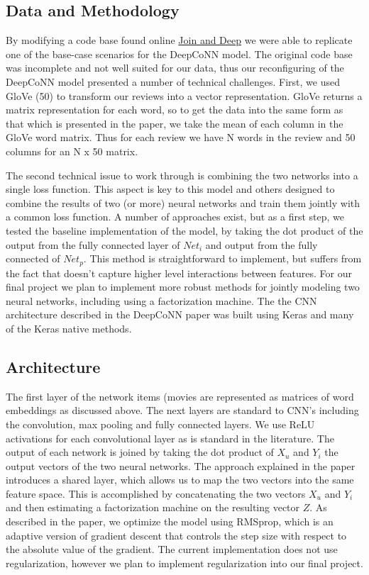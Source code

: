\documentclass[10pt,twocolumn,letterpaper]{article}
\begin{document}
\subsection{Data and Methodology}

By modifying a code base found online \href{https://github.com/Praznat/uifud/tree/291b0882b02bf77edf9b310aeeb345784113b1f5}{Join and Deep} we were able to replicate one of the base-case scenarios for the DeepCoNN model. The original code base was incomplete and not well suited for our data, thus our reconfiguring of the DeepCoNN model presented a number of technical challenges. First, we used GloVe (50) to transform our reviews into a vector representation. GloVe returns a matrix representation for each word, so to get the data into the same form as that which is presented in the paper, we take the mean of each column in the GloVe word matrix. Thus for each review we have N words in the review and 50 columns for an N x 50 matrix.

The second technical issue to work through is combining the two networks into a single loss function. This aspect is key to this model and others designed to combine the results of two (or more) neural networks and train them jointly with a common loss function. A number of approaches exist, but as a first step, we tested the baseline implementation of the model, by taking the dot product of the output from the fully connected layer of $Net_{i}$ and output from the fully connected of $Net_{p}$. This method is straightforward to implement, but suffers from the fact that doesn't capture higher level interactions between features. For our final project we plan to implement more robust methods for jointly modeling two neural networks, including using a factorization machine. The the CNN architecture described in the DeepCoNN paper was built using Keras and many of the Keras native methods. 

\subsection{Architecture}

The first layer of the network items (movies are represented as matrices of word embeddings as discussed above. The next layers are standard to CNN's including the convolution, max pooling and fully connected layers.  We use ReLU activations for each convolutional layer as is standard in the literature. The output of each network is joined by taking the dot product of $X_{u}$ and $Y_{i}$ the output vectors of the two neural networks. The approach explained in the paper introduces a shared layer, which allows us to map the two vectors into the same feature space. This is accomplished by concatenating the two vectors $X_{u}$ and $Y_{i}$ and then estimating a factorization machine on the resulting vector $Z$. As described in the paper, we optimize the model using RMSprop, which is an adaptive version of gradient descent that controls the step size with respect to the absolute value of the gradient. The current implementation does not use regularization, however we plan to implement regularization into our final project. 
\end{document}
